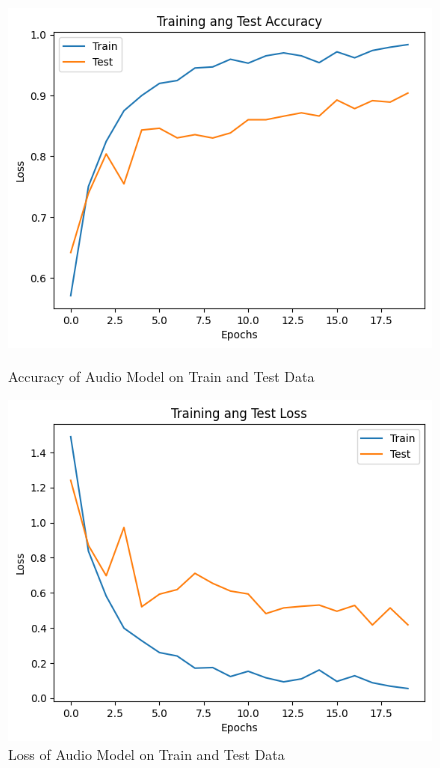 \documentclass[fleqn, 10pt, twoside]{IOEGC}
\begin{document}
\begin{figure}[ht]
	\centering
	\begin{minipage}[ht]{0.45\textwidth}
		\centering
		\includegraphics[width=0.8\linewidth]{Graphics/audio_accuracy.png}
		\caption{Accuracy of Audio Model on Train and Test Data}
		\label{accuracy-audio}
	\end{minipage}
	\hfill
	\begin{minipage}[ht]{0.45\textwidth}
		\centering
		\includegraphics[width=0.8\linewidth]{Graphics/audio_loss.png}
		\caption{Loss of Audio Model on Train and Test Data}
		\label{loss-audio}
	\end{minipage}
\end{figure}
\end{document}
